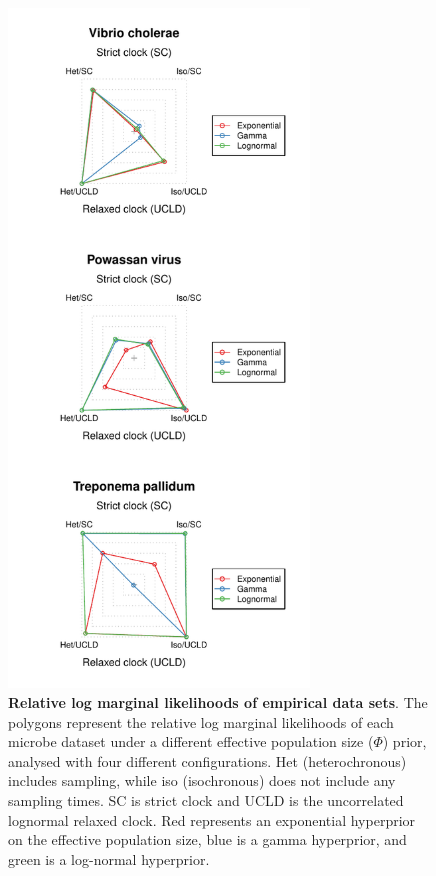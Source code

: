 \documentclass[10pt,letterpaper]{article}
\begin{document}
\begin{figure}
	\begin{center}
		\includegraphics[width=8cm]{sandbox_figures/polygon_plot.pdf}\newline
		\vspace{-0.5cm}
		\caption{\textbf{Relative log marginal likelihoods of empirical data sets}. The polygons represent the relative log marginal likelihoods of each microbe dataset under a different effective population size ($\Phi$) prior, analysed with four different configurations. Het (heterochronous) includes sampling, while iso (isochronous) does not include any sampling times. SC is strict clock and UCLD is the uncorrelated lognormal relaxed clock. Red represents an exponential hyperprior on the effective population size, blue is a gamma hyperprior, and green is a log-normal hyperprior.}
		\label{figure:polygon_plots}
	\end{center}
\end{figure}
\end{document}
